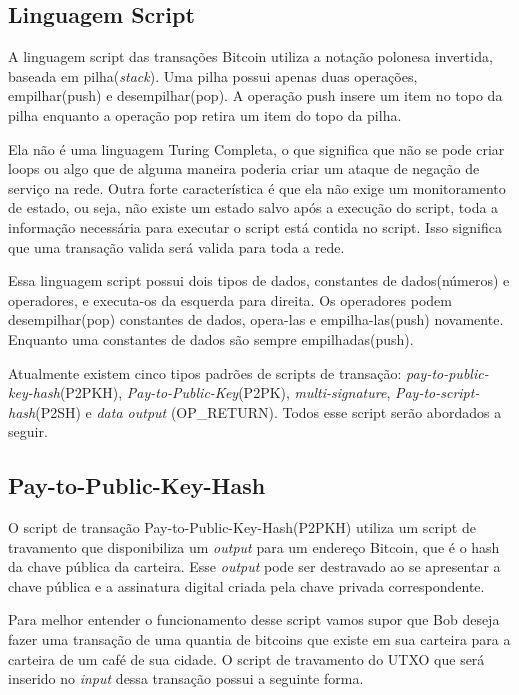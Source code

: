 \documentclass[conference,compsoc]{IEEEtran}
\begin{document}
\subsection*{Linguagem Script}  
\label{section:Linguagem Script}
A linguagem script das transações Bitcoin utiliza a notação polonesa invertida, baseada em pilha(\textit{stack}). Uma pilha possui apenas duas operações, empilhar(push) e desempilhar(pop). A operação push insere um item no topo da pilha enquanto a operação pop retira um item do topo da pilha.

Ela não é uma linguagem Turing Completa, o que significa que não se pode criar loops ou algo que de alguma maneira poderia criar um ataque de negação de serviço na rede. Outra forte característica é que ela não exige um monitoramento de estado, ou seja, não existe um estado salvo após a execução do script, toda a informação necessária para executar o script está contida no script. Isso significa que uma transação valida será valida para toda a rede.

Essa linguagem script possui dois tipos de dados, constantes de dados(números) e operadores, e executa-os da esquerda para direita. Os operadores podem desempilhar(pop) constantes de dados, opera-las e empilha-las(push) novamente. Enquanto uma constantes de dados são sempre empilhadas(push).

Atualmente existem cinco tipos padrões de scripts de transação: \textit{pay-to-public-key-hash}(P2PKH), \textit{Pay-to-Public-Key}(P2PK), \textit{multi-signature}, \textit{Pay-to-script-hash}(P2SH) e \textit{data output} (OP\_RETURN). Todos esse script serão abordados a seguir.

\subsection*{Pay-to-Public-Key-Hash}
O script de transação Pay-to-Public-Key-Hash(P2PKH) utiliza um script de travamento que disponibiliza um \textit{output} para um endereço Bitcoin, que é o hash da chave pública da carteira. Esse \textit{output} pode ser destravado ao se apresentar a chave pública e a assinatura digital criada pela chave privada correspondente.

Para melhor entender o funcionamento desse script vamos supor que Bob deseja fazer uma transação de uma quantia de bitcoins que existe em sua carteira para a carteira de um café de sua cidade. O script de travamento do UTXO que será inserido no \textit{input} dessa transação possui a seguinte forma.
\end{document}
